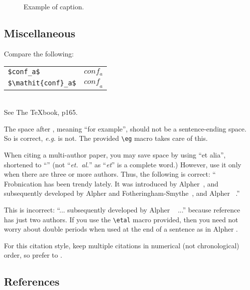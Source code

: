 \documentclass[10pt,twocolumn,letterpaper]{article}
\begin{document}
\begin{figure}[t]
\begin{center}
\fbox{\rule{0pt}{2in} \rule{0.9\linewidth}{0pt}}
\end{center}
   \caption{Example of caption.  }
\label{fig:long}
\label{fig:onecol}
\end{figure}

\subsection{Miscellaneous}

\noindent
Compare the following:\\
\begin{tabular}{ll}
 \verb'$conf_a$' &  $conf_a$ \\
 \verb'$\mathit{conf}_a$' & $\mathit{conf}_a$
\end{tabular}\\
See The \TeX book, p165.

The space after \eg, meaning ``for example'', should not be a
sentence-ending space. So \eg is correct, {\em e.g.} is not.  The provided
\verb'\eg' macro takes care of this.

When citing a multi-author paper, you may save space by using ``et alia'',
shortened to ``\etal'' (not ``{\em et.\ al.}'' as ``{\em et}'' is a complete word.)
However, use it only when there are three or more authors.  Thus, the
following is correct: ``
   Frobnication has been trendy lately.
   It was introduced by Alpher~\cite{Alpher02}, and subsequently developed by
   Alpher and Fotheringham-Smythe~\cite{Alpher03}, and Alpher \etal~\cite{Alpher04}.''

This is incorrect: ``... subsequently developed by Alpher \etal~\cite{Alpher03} ...''
because reference~\cite{Alpher03} has just two authors.  If you use the
\verb'\etal' macro provided, then you need not worry about double periods
when used at the end of a sentence as in Alpher \etal.

For this citation style, keep multiple citations in numerical (not
chronological) order, so prefer \cite{Alpher03,Alpher02,Authors12} to
\cite{Alpher02,Alpher03,Authors12}.

\subsection{References}
\end{document}
